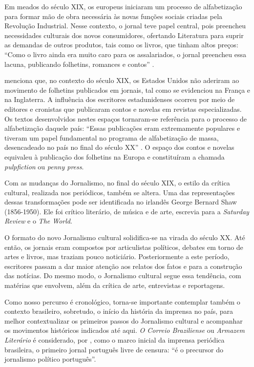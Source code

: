 \documentclass[portuguese]{textolivre}
\begin{document}
Em meados do século XIX, os europeus iniciaram um processo de alfabetização para formar mão de obra necessária às novas funções sociais criadas pela Revolução Industrial. Nesse contexto, o jornal teve papel central, pois preencheu necessidades culturais dos novos consumidores, ofertando Literatura para suprir as demandas de outros produtos, tais como os livros, que tinham altos preços: “Como o livro ainda era muito caro para os assalariados, o jornal preencheu essa lacuna, publicando folhetins, romances e contos” \cite[p. 09]{arnt2001}.

\textcite{arnt2001} menciona que, no contexto do século XIX, os Estados Unidos não aderiram ao movimento de folhetins publicados em jornais, tal como se evidenciou na França e na Inglaterra. A influência dos escritores estadunidenses ocorreu por meio de editores e cronistas que publicaram contos e novelas em revistas especializadas. Os textos desenvolvidos nestes espaços tornaram-se referência para o processo de alfabetização daquele país: “Essas publicações eram extremamente populares e tiveram um papel fundamental no programa de alfabetização de massa, desencadeado no país no final do século XX” \cite[p. 09]{arnt2001}. O espaço dos contos e novelas equivaleu à publicação dos folhetins na Europa e constituíram a chamada \textit{pulpfiction} ou \textit{penny press}.

Com as mudanças do Jornalismo, no final do século XIX, o estilo da crítica cultural, realizada nos periódicos, também se altera. Uma das representações dessas transformações pode ser identificada no irlandês George Bernard Shaw (1856-1950). Ele foi crítico literário, de música e de arte, escrevia para a \textit{Saturday Review} e o \textit{The World}.

O formato do novo Jornalismo cultural solidifica-se na virada do século XX. Até então, os jornais eram compostos por articulistas políticos, debates em torno de artes e livros, mas traziam pouco noticiário. Posteriormente a este período, escritores passam a dar maior atenção aos relatos dos fatos e para a construção das notícias. Do mesmo modo, o Jornalismo cultural segue essa tendência, com matérias que envolvem, além da crítica de arte, entrevistas e reportagens.

Como nosso percurso é cronológico, torna-se importante contemplar também o contexto brasileiro, sobretudo, o início da história da imprensa no país, para melhor contextualizar os primeiros passos do Jornalismo cultural e acompanhar os movimentos históricos indicados até aqui. \textit{O Correio Braziliense} ou \textit{Armazem Literário} é considerado, por \textcite[p. 03]{dines2000}, como o marco inicial da imprensa periódica brasileira, o primeiro jornal português livre de censura: “é o precursor do jornalismo político português”.
\end{document}
